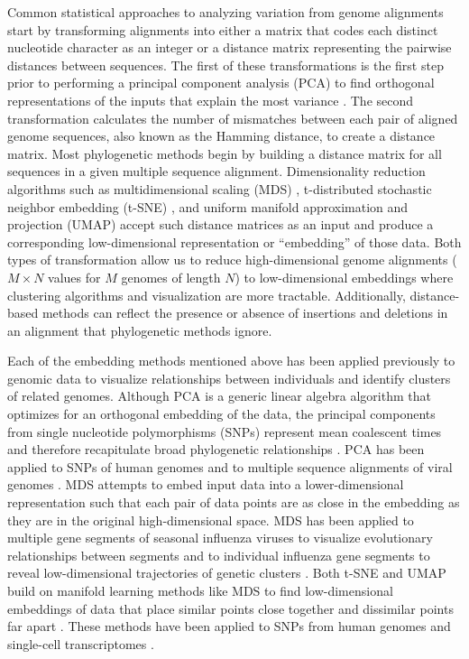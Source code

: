 \documentclass[10pt,letterpaper]{article}
\begin{document}
Common statistical approaches to analyzing variation from genome alignments start by transforming alignments into either a matrix that codes each distinct nucleotide character as an integer or a distance matrix representing the pairwise distances between sequences.
The first of these transformations is the first step prior to performing a principal component analysis (PCA) to find orthogonal representations of the inputs that explain the most variance \cite{jolliffe_cadima_2016}.
The second transformation calculates the number of mismatches between each pair of aligned genome sequences, also known as the Hamming distance, to create a distance matrix.
Most phylogenetic methods begin by building a distance matrix for all sequences in a given multiple sequence alignment.
Dimensionality reduction algorithms such as multidimensional scaling (MDS) \cite{hout_papesh_goldinger_2012}, t-distributed stochastic neighbor embedding (t-SNE) \cite{maaten2008visualizing}, and uniform manifold approximation and projection (UMAP) \cite{lel2018umap} accept such distance matrices as an input and produce a corresponding low-dimensional representation or ``embedding'' of those data.
Both types of transformation allow us to reduce high-dimensional genome alignments ($M \times N$ values for $M$ genomes of length $N$) to low-dimensional embeddings where clustering algorithms and visualization are more tractable.
Additionally, distance-based methods can reflect the presence or absence of insertions and deletions in an alignment that phylogenetic methods ignore.

Each of the embedding methods mentioned above has been applied previously to genomic data to visualize relationships between individuals and identify clusters of related genomes.
Although PCA is a generic linear algebra algorithm that optimizes for an orthogonal embedding of the data, the principal components from single nucleotide polymorphisms (SNPs) represent mean coalescent times and therefore recapitulate broad phylogenetic relationships \cite{mcvean_2009}.
PCA has been applied to SNPs of human genomes \cite{novembre_2008,alexander_2009,mcvean_2009,auton_2015} and to multiple sequence alignments of viral genomes \cite{metsky_2017}.
MDS attempts to embed input data into a lower-dimensional representation such that each pair of data points are as close in the embedding as they are in the original high-dimensional space.
MDS has been applied to multiple gene segments of seasonal influenza viruses to visualize evolutionary relationships between segments \cite{rambaut_2008} and to individual influenza gene segments to reveal low-dimensional trajectories of genetic clusters \cite{He2010,Ito2011}.
Both t-SNE and UMAP build on manifold learning methods like MDS to find low-dimensional embeddings of data that place similar points close together and dissimilar points far apart \cite{kobak_2021}.
These methods have been applied to SNPs from human genomes \cite{diaz-papkovich_2019} and single-cell transcriptomes \cite{becht_2018,kobak_2019}.
\end{document}
